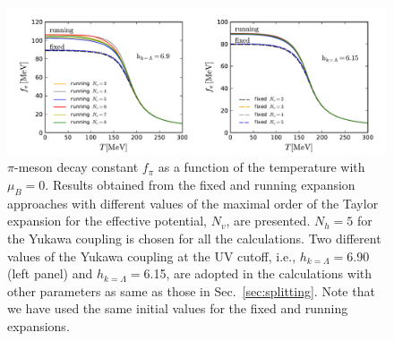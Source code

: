 \documentclass[%
reprint,
superscriptaddress,
showpacs,preprintnumbers,
 amsmath,amssymb,
 aps,
prd,
]{revtex4-1}
\def\sec#1{Sec.~\ref{#1}}
\begin{document}
%
\begin{figure}[t]
\includegraphics[width=1\textwidth]{fpi-expan}
\caption{$\pi$-meson decay constant $f_\pi$ as a function of the temperature with $\mu_B=0$.  Results obtained from the fixed and running expansion approaches with different values of the maximal order of the Taylor expansion for the effective potential, $N_v$, are presented. $N_h=5$ for the Yukawa coupling is chosen for all the calculations. Two different values of the Yukawa coupling at the UV cutoff, i.e., $h_{k=\Lambda}=$6.90 (left panel) and $h_{k=\Lambda}=$6.15, are adopted in the calculations with other parameters as same as those in \sec{sec:splitting}. Note that we have used the same initial values for the fixed and running expansions.}\label{fig:fpi-expan}
\end{figure}
%
\end{document}
